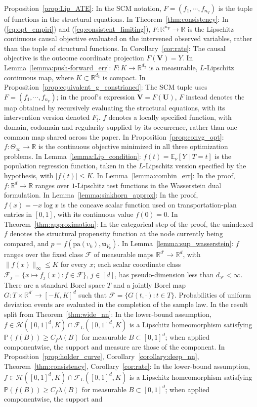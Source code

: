\documentclass[12pt]{article}
\theoremstyle{plain}
\theoremstyle{definition}
\theoremstyle{remark}
\begin{document}
Proposition~\ref{prop:Lip_ATE}: In the SCM notation, $F=(f_1,\cdots,f_{n_V})$ is the tuple of functions in the structural equations. In Theorem~\ref{thm:consistency}: In (\ref{eq:opt_empiri}) and (\ref{eq:consistent_limiting}), $F:\mathbb{R}^{n_V}\to\mathbb{R}$ is the Lipschitz continuous causal objective evaluated on the intervened observed variables, rather than the tuple of structural functions. In Corollary~\ref{cor:rate}: The causal objective is the outcome coordinate projection $F(\boldsymbol{V})=Y$. In Lemma~\ref{lemma:push-forward_err}: $F:K\to\mathbb{R}^{d_2}$ is a measurable, $L$-Lipschitz continuous map, where $K\subset\mathbb{R}^{d_1}$ is compact. In Proposition~\ref{prop:equivalent_g_constrianed}: The SCM tuple uses $F=(f_1,\cdots,f_{n_V})$; in the proof's expression $\boldsymbol{V}=F(\boldsymbol{U})$, $F$ instead denotes the map obtained by recursively evaluating the structural equations, with its intervention version denoted $F_t$. $f$ denotes a locally specified function, with domain, codomain and regularity supplied by its occurrence, rather than one common map shared across the paper. In Proposition~\ref{prop:convg_opt}: $f:\Theta_\infty\rightarrow\mathbb{R}$ is the continuous objective minimized in all three optimization problems. In Lemma~\ref{lemma:Lip_condition}: $f(t)=\mathbb{E}_{\nu}[Y\mid T=t]$ is the population regression function, taken in the $L$-Lipschitz version specified by the hypothesis, with $|f(t)|\leqslant K$. In Lemma~\ref{lemma:combin_err}: In the proof, $f:\mathbb{R}^d\rightarrow\mathbb{R}$ ranges over $1$-Lipschitz test functions in the Wasserstein dual formulation. In Lemma~\ref{lemma:sinkhorn_approx}: In the proof, $f(x)=-x\log x$ is the concave scalar function used on transportation-plan entries in $[0,1]$, with its continuous value $f(0)=0$. In Theorem~\ref{thm:approximation}: In the categorical step of the proof, the unindexed $f$ denotes the structural propensity function at the node currently being compared, and $p=f(\text{pa}(v_k),\boldsymbol{u}_{V_k})$. In Lemma~\ref{lemma:sup_wasserstein}: $f$ ranges over the fixed class $\mathcal F$ of measurable maps $\mathbb R^{d'}\rightarrow\mathbb R^d$, with $\|f(x)\|_\infty\leqslant K$ for every $x$; each scalar coordinate class $\mathcal F_j=\{x\mapsto f_j(x):f\in\mathcal F\}$, $j\in[d]$, has pseudo-dimension less than $d_{\mathcal F}<\infty$. There are a standard Borel space $T$ and a jointly Borel map $G:T\times\mathbb R^{d'}\rightarrow[-K,K]^d$ such that $\mathcal F=\{G(t,\cdot):t\in T\}$. Probabilities of uniform deviation events are evaluated in the completion of the sample law. In the result split from Theorem~\ref{thm:wide_nn}: In the lower-bound assumption, $f\in\mathcal{H}([0,1]^d,K)\cap\mathcal{F}_L([0,1]^d,K)$ is a Lipschitz homeomorphism satisfying $\mathbb{P}(f(B))\geqslant C_f\lambda(B)$ for measurable $B\subset[0,1]^d$; when applied componentwise, the support and measure are those of the component. In Proposition~\ref{prop:holder_curve}, Corollary~\ref{corollary:deep_nn}, Theorem~\ref{thm:consistency}, Corollary~\ref{cor:rate}: In the lower-bound assumption, $f\in\mathcal{H}([0,1]^d,K)\cap\mathcal{F}_L([0,1]^d,K)$ is a Lipschitz homeomorphism satisfying $\mathbb{P}(f(B))\geqslant C_f\lambda(B)$ for measurable $B\subset[0,1]^d$; when applied componentwise, the support and 
\end{document}
